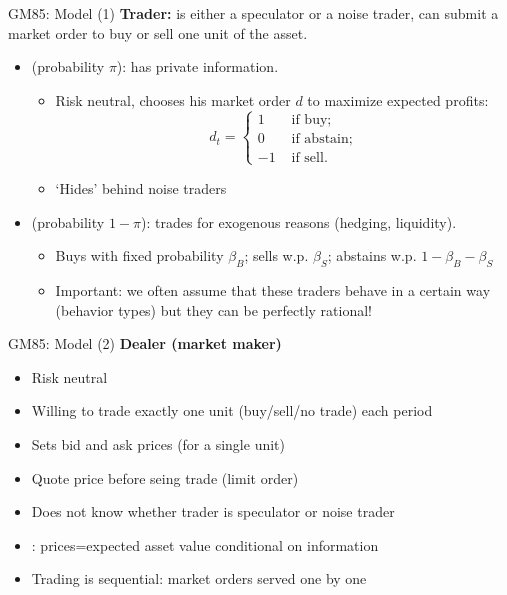 \documentclass[english,10pt]{beamer}
\begin{document}
\begin{frame}{GM85: Model (1)}
	\textbf{Trader:} is either a speculator or a noise trader, can submit a market order to buy or sell one unit of the asset.
	\begin{itemize}
		\item {} (probability $\pi$): has private information.
		\begin{itemize}
			\item Risk neutral, chooses his market order $d$ to maximize expected profits:
			\begin{equation*}
				d_t= \left\{
				\begin{aligned}
				1	& \text{ if buy}; \\
				0	& \text{ if abstain}; \\
				-1	& \text{ if sell}.
				\end{aligned}
				\right.
			\end{equation*}
			\item `Hides' behind noise traders
		\end{itemize}
		\item {} (probability $1-\pi$): trades for exogenous reasons (hedging, liquidity).
		\begin{itemize}
			\item Buys with fixed probability $\beta_B$; sells w.p. $\beta_S$; abstains w.p. $1-\beta_B - \beta_S$
			\item \alert{Important}: we often assume that these traders behave in a certain way (behavior types) but they can be perfectly rational!
		\end{itemize}
	\end{itemize}
\end{frame}


\begin{frame}{GM85: Model (2)}
	\textbf{Dealer (market maker)}
	\begin{itemize}
		\item Risk neutral
		\item Willing to trade \alert{exactly one unit} (buy/sell/no trade) each period
		\item Sets \alert{bid and ask prices} (for a single unit)
		\item Quote price before seing trade (limit order)
		\item Does not know whether trader is speculator or noise trader
		\item {}: prices=expected asset value conditional on information
		\item Trading is sequential: market orders served one by one
	\end{itemize}
\end{frame}
\end{document}
